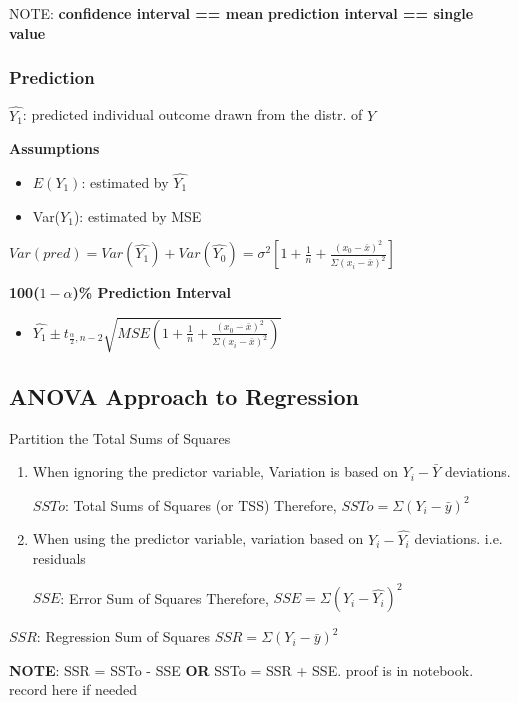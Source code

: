 \documentclass[11pt]{article}
\begin{document}
NOTE:
\textbf{confidence interval == mean}
\textbf{prediction interval == single value}

\subsubsection{Prediction}
\label{sec:org3d12136}
\(\hat{Y_1}\): predicted individual outcome drawn from the distr. of \(Y\)

\textbf{Assumptions}
\begin{itemize}
\item \(E(Y_1)\): estimated by \(\hat{Y_1}\)
\item Var(\(Y_1\)): estimated by MSE
\end{itemize}

\(Var(pred) = Var(\hat{Y_1}) + Var(\hat{Y_0}) = \sigma^2 [ 1 + \frac{1}{n} +
\frac{(x_0 - \bar{x})^2}{\Sigma (x_i - \bar{x})^2}]\)

\textbf{100(\(1 - \alpha\))\% Prediction Interval}
\begin{itemize}
\item \(\hat{Y_1} \pm t_{\frac{\alpha}{2}, n - 2} \sqrt{MSE (1 + \frac{1}{n} +
  \frac{(x_0 - \bar{x})^2}{\Sigma (x_i - \bar{x})^2})}\)
\end{itemize}

\subsection{ANOVA Approach to Regression}
\label{sec:org591e0f8}

Partition the Total Sums of Squares
\begin{enumerate}
\item When ignoring the predictor variable, Variation is based on \(Y_i - \bar{Y}\)
deviations.

\(SSTo\): Total Sums of Squares (or TSS)
Therefore, \(SSTo = \Sigma(Y_i - \bar{y})^2\)

\item When using the predictor variable, variation based on \(Y_i - \hat{Y_i}\)
deviations. i.e. residuals

\(SSE\): Error Sum of Squares
Therefore, \(SSE = \Sigma(Y_i - \hat{Y_i})^2\)
\end{enumerate}

\(SSR\): Regression Sum of Squares
\(SSR = \Sigma (Y_i - \bar{y})^2\)

\textbf{NOTE}: SSR = SSTo - SSE \textbf{OR} SSTo = SSR + SSE. proof is in notebook. record
here if needed
\end{document}
